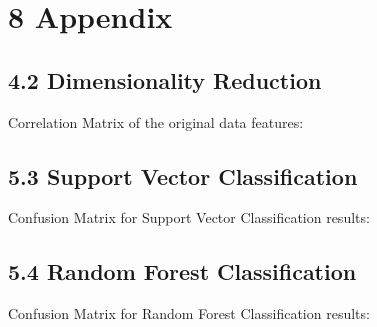 \documentclass{article}
\begin{document}
\setcounter{page}{12}
\section*{8 \space Appendix}

\subsection*{4.2 \space Dimensionality Reduction}
Correlation Matrix of the original data features:\\

\begin{center}
  \hspace*{-0.05\linewidth}
  
\end{center}

\newpage
\subsection*{5.3 \space Support Vector Classification}
Confusion Matrix for Support Vector Classification results:
\begin{center}
  \hspace*{-0.05\linewidth}
  
\end{center}

\newpage
\subsection*{5.4 \space Random Forest Classification}
Confusion Matrix for Random Forest Classification results:
\begin{center}
  \hspace*{-0.05\linewidth}
  
\end{center}

\newpage
\end{document}
